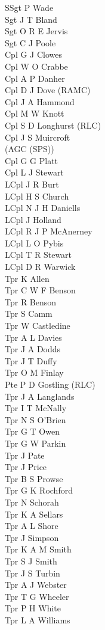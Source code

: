 \begin{multicols}{3}
  \small
  \noindent
  SSgt P Wade \\
  Sgt J T Bland \\
  Sgt O R E Jervis \\
  Sgt C J Poole \\
  Cpl G J Clowes \\
  Cpl W O Crabbe \\
  Cpl A P Danher \\
  Cpl D J Dove (RAMC) \\
  Cpl J A Hammond \\
  Cpl M W Knott \\
  Cpl S D Longhurst (RLC) \\
  Cpl J S Muircroft \\ \indent (AGC (SPS)) \\
  Cpl G G Platt \\
  Cpl L J Stewart \\
  LCpl J R Burt \\
  LCpl H S Church \\
  LCpl N J H Daniells \\
  LCpl J Holland \\
  LCpl R J P McAnerney \\
  LCpl L O Pybis \\
  LCpl T R Stewart \\
  LCpl D R Warwick \\
  Tpr K Allen \\
  Tpr C W F Benson \\
  Tpr R Benson \\
  Tpr S Camm \\
  Tpr W Castledine \\
  Tpr A L Davies \\
  Tpr J A Dodds \\
  Tpr J T Duffy \\
  Tpr O M Finlay \\
  Pte P D Gostling (RLC) \\
  Tpr J A Langlands \\
  Tpr I T McNally \\
  Tpr N S O'Brien \\
  Tpr G T Owen \\
  Tpr G W Parkin \\
  Tpr J Pate \\
  Tpr J Price \\
  Tpr B S Prowse \\
  Tpr G K Rochford \\
  Tpr N Schorah \\
  Tpr K A Sellars \\
  Tpr A L Shore \\
  Tpr J Simpson \\
  Tpr K A M Smith \\
  Tpr S J Smith \\
  Tpr J S Turbin \\
  Tpr A J Webster \\
  Tpr T G Wheeler \\
  Tpr P H White \\
  Tpr L A Williams \\
\end{multicols}

